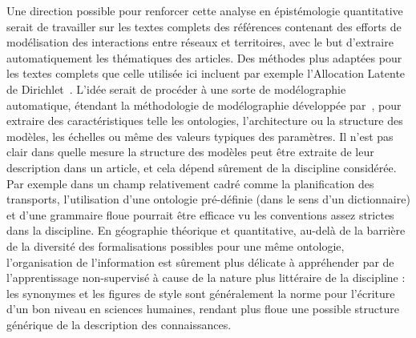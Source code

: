 {Une direction possible pour renforcer cette analyse en épistémologie quantitative serait de travailler sur les textes complets des références contenant des efforts de modélisation des interactions entre réseaux et territoires, avec le but d'extraire automatiquement les thématiques des articles. Des méthodes plus adaptées pour les textes complets que celle utilisée ici incluent par exemple l'Allocation Latente de Dirichlet~\cite{blei2003latent}. L'idée serait de procéder à une sorte de modélographie automatique, étendant la méthodologie de modélographie développée par~\cite{schmitt2013modelographie}, pour extraire des caractéristiques telle les ontologies, l'architecture ou la structure des modèles, les échelles ou même des valeurs typiques des paramètres. Il n'est pas clair dans quelle mesure la structure des modèles peut être extraite de leur description dans un article, et cela dépend sûrement de la discipline considérée. Par exemple dans un champ relativement cadré comme la planification des transports, l'utilisation d'une ontologie pré-définie (dans le sens d'un dictionnaire) et d'une grammaire floue pourrait être efficace vu les conventions assez strictes dans la discipline. En géographie théorique et quantitative, au-delà de la barrière de la diversité des formalisations possibles pour une même ontologie, l'organisation de l'information est sûrement plus délicate à appréhender par de l'apprentissage non-supervisé à cause de la nature plus littéraire de la discipline : les synonymes et les figures de style sont généralement la norme pour l'écriture d'un bon niveau en sciences humaines, rendant plus floue une possible structure générique de la description des connaissances.
}








